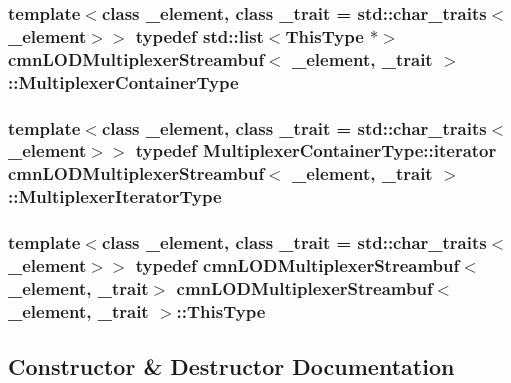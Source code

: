 \subsubsection[{Multiplexer\+Container\+Type}]{\setlength{\rightskip}{0pt plus 5cm}template$<$class \+\_\+element, class \+\_\+trait = std\+::char\+\_\+traits$<$\+\_\+element$>$$>$ typedef std\+::list$<${\bf This\+Type} $\ast$$>$ {\bf cmn\+L\+O\+D\+Multiplexer\+Streambuf}$<$ \+\_\+element, \+\_\+trait $>$\+::{\bf Multiplexer\+Container\+Type}}\label{classcmn_l_o_d_multiplexer_streambuf_abddd0ebc7e720ea977f857c6350dd5a0}
\hypertarget{classcmn_l_o_d_multiplexer_streambuf_addfaa1fedcd4e3b6df8e4020ec2cbde3}{}
\subsubsection[{Multiplexer\+Iterator\+Type}]{\setlength{\rightskip}{0pt plus 5cm}template$<$class \+\_\+element, class \+\_\+trait = std\+::char\+\_\+traits$<$\+\_\+element$>$$>$ typedef Multiplexer\+Container\+Type\+::iterator {\bf cmn\+L\+O\+D\+Multiplexer\+Streambuf}$<$ \+\_\+element, \+\_\+trait $>$\+::{\bf Multiplexer\+Iterator\+Type}}\label{classcmn_l_o_d_multiplexer_streambuf_addfaa1fedcd4e3b6df8e4020ec2cbde3}
\hypertarget{classcmn_l_o_d_multiplexer_streambuf_aa50efd43cb53bb6be746e3990e02452a}{}
\subsubsection[{This\+Type}]{\setlength{\rightskip}{0pt plus 5cm}template$<$class \+\_\+element, class \+\_\+trait = std\+::char\+\_\+traits$<$\+\_\+element$>$$>$ typedef {\bf cmn\+L\+O\+D\+Multiplexer\+Streambuf}$<$\+\_\+element, \+\_\+trait$>$ {\bf cmn\+L\+O\+D\+Multiplexer\+Streambuf}$<$ \+\_\+element, \+\_\+trait $>$\+::{\bf This\+Type}}\label{classcmn_l_o_d_multiplexer_streambuf_aa50efd43cb53bb6be746e3990e02452a}


\subsection{Constructor \& Destructor Documentation}
\hypertarget{classcmn_l_o_d_multiplexer_streambuf_aa1c3f01ca13437d1c457632be57e4900}{}
